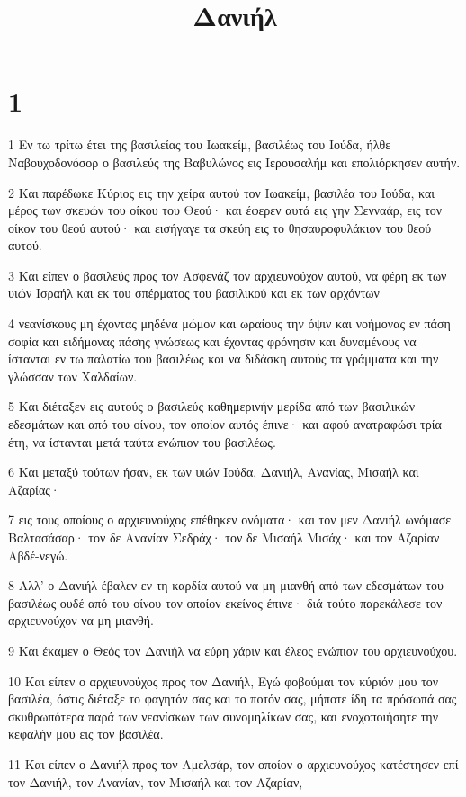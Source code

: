 

\title{Δανιήλ}


\chapter{1}

\par 1 Εν τω τρίτω έτει της βασιλείας του Ιωακείμ, βασιλέως του Ιούδα, ήλθε Ναβουχοδονόσορ ο βασιλεύς της Βαβυλώνος εις Ιερουσαλήμ και επολιόρκησεν αυτήν.
\par 2 Και παρέδωκε Κύριος εις την χείρα αυτού τον Ιωακείμ, βασιλέα του Ιούδα, και μέρος των σκευών του οίκου του Θεού· και έφερεν αυτά εις γην Σενναάρ, εις τον οίκον του θεού αυτού· και εισήγαγε τα σκεύη εις το θησαυροφυλάκιον του θεού αυτού.
\par 3 Και είπεν ο βασιλεύς προς τον Ασφενάζ τον αρχιευνούχον αυτού, να φέρη εκ των υιών Ισραήλ και εκ του σπέρματος του βασιλικού και εκ των αρχόντων
\par 4 νεανίσκους μη έχοντας μηδένα μώμον και ωραίους την όψιν και νοήμονας εν πάση σοφία και ειδήμονας πάσης γνώσεως και έχοντας φρόνησιν και δυναμένους να ίστανται εν τω παλατίω του βασιλέως και να διδάσκη αυτούς τα γράμματα και την γλώσσαν των Χαλδαίων.
\par 5 Και διέταξεν εις αυτούς ο βασιλεύς καθημερινήν μερίδα από των βασιλικών εδεσμάτων και από του οίνου, τον οποίον αυτός έπινε· και αφού ανατραφώσι τρία έτη, να ίστανται μετά ταύτα ενώπιον του βασιλέως.
\par 6 Και μεταξύ τούτων ήσαν, εκ των υιών Ιούδα, Δανιήλ, Ανανίας, Μισαήλ και Αζαρίας·
\par 7 εις τους οποίους ο αρχιευνούχος επέθηκεν ονόματα· και τον μεν Δανιήλ ωνόμασε Βαλτασάσαρ· τον δε Ανανίαν Σεδράχ· τον δε Μισαήλ Μισάχ· και τον Αζαρίαν Αβδέ-νεγώ.
\par 8 Αλλ' ο Δανιήλ έβαλεν εν τη καρδία αυτού να μη μιανθή από των εδεσμάτων του βασιλέως ουδέ από του οίνου τον οποίον εκείνος έπινε· διά τούτο παρεκάλεσε τον αρχιευνούχον να μη μιανθή.
\par 9 Και έκαμεν ο Θεός τον Δανιήλ να εύρη χάριν και έλεος ενώπιον του αρχιευνούχου.
\par 10 Και είπεν ο αρχιευνούχος προς τον Δανιήλ, Εγώ φοβούμαι τον κύριόν μου τον βασιλέα, όστις διέταξε το φαγητόν σας και το ποτόν σας, μήποτε ίδη τα πρόσωπά σας σκυθρωπότερα παρά των νεανίσκων των συνομηλίκων σας, και ενοχοποιήσητε την κεφαλήν μου εις τον βασιλέα.
\par 11 Και είπεν ο Δανιήλ προς τον Αμελσάρ, τον οποίον ο αρχιευνούχος κατέστησεν επί τον Δανιήλ, τον Ανανίαν, τον Μισαήλ και τον Αζαρίαν,
